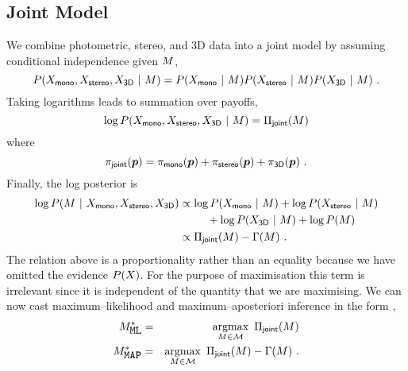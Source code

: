\subsection{Joint Model}
We combine photometric, stereo, and 3D data into a joint model by
assuming conditional independence given $\Scene$,
\begin{equation}
  P(\Observations_{\textsf{mono}}, \Observations_{\textsf{stereo}}, \Observations_{\textsf{3D}} ~|~ \Scene)
  =
    P(\Observations_{\textsf{mono}} ~|~ \Scene)
    P(\Observations_{\textsf{stereo}} ~|~ \Scene)
    P(\Observations_{\textsf{3D}} ~|~ \Scene) ~.
  \label{eq:full-posterior}
\end{equation}
Taking logarithms leads to summation over payoffs,
\begin{equation}
  \log P(\Observations_{\textsf{mono}}, \Observations_{\textsf{stereo}}, \Observations_{\textsf{3D}} ~|~ \Scene)
  = \ScenePayoff_{\textsf{joint}}(\Scene)
\end{equation}
where
\begin{equation}
  \JointPayoff(\Pixel) =
  \MonoPayoff(\Pixel) + 
  \StereoPayoff(\Pixel) +
  \DepthPayoff(\Pixel) ~.
\end{equation}
Finally, the log posterior is
\begin{equation}
  \begin{split}
    \log P(\Scene ~|~
           \Observations_{\textsf{mono}},
           \Observations_{\textsf{stereo}},
           \Observations_{\textsf{3D}})
    & \propto
      \log P(\Observations_{\textsf{mono}} ~|~ \Scene)
      +\log P(\Observations_{\textsf{stereo}} ~|~ \Scene) \\
    & \qquad + \log P(\Observations_{\textsf{3D}} ~|~ \Scene) + \log P(\Scene)\\
    & \propto \ScenePayoff_{\textsf{joint}}(\Scene) - \ScenePenalty(\Scene)~.
  \end{split}
  \label{eq:joint-posterior}
\end{equation}
The relation above is a proportionality rather than an equality
because we have omitted the evidence $P(\Observations)$. For the
purpose of maximisation this term is irrelevant since it is
independent of the quantity that we are maximising. We can now cast
maximum--likelihood and maximum--aposteriori inference in the form
,
\begin{eqnarray}
  \OptimalScene_{\mbox{\tt ML}} &=& 
    \argmax_{\Scene\in\SetOfScenes}\limits~
    \ScenePayoff_{\textsf{joint}}(\Scene)\\
  \OptimalScene_{\mbox{\tt MAP}} &=& 
    \argmax_{\Scene\in\SetOfScenes}\limits~
    \ScenePayoff_{\textsf{joint}}(\Scene) - \ScenePenalty(\Scene) ~.
\end{eqnarray}

